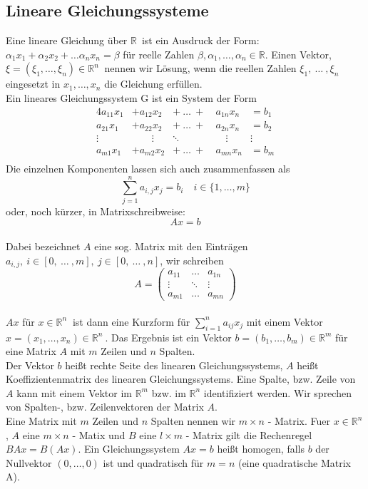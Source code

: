 \documentclass{article}
\newcommand{\R}{\mathbb{R}}
\newcommand{\mR}{$\mathbb{R}$\ }
\newcommand{\Rn}{\mathbb{R}^n\ }
\begin{document}
\subsection{Lineare Gleichungssysteme}
Eine lineare Gleichung über \mR ist ein Ausdruck der Form: $\alpha_1x_1 + \alpha_2 x_2 + \dots \alpha_n x_n = \beta$ für reelle Zahlen $\beta, \alpha_1, \dots, \alpha_n \in \R$. Einen Vektor, $\xi = \left(\xi_1, \dots, \xi_n\right) \in \Rn$ nennen wir Lösung, wenn die reellen Zahlen  $\xi_1, \ \dots\ , \xi_n$ eingesetzt in $x_1, \dots, x_n$ die Gleichung erfüllen.\\
Ein lineares Gleichungssystem G ist ein System der Form
\begin{alignat*}{4}
	a_{11} x_1 &+ a_{12}x_2 &+\ \dots\ +\ & a_{1n} x_n &= b_1\\
	a_{21} x_1 &+ a_{22}x_2 &+\ \dots\ +\ & a_{2n} x_n &= b_2\\
	\vdots\quad & \qquad\vdots&\ddots\quad \ \ &\quad\vdots & \vdots\  \\
	a_{m1} x_1 &+ a_{m2} x_2  &+\ \dots\ +\ & a_{mn} x_n &= b_m\\
\end{alignat*}
Die einzelnen Komponenten lassen sich auch zusammenfassen als $$\sum_{j=1}^n a_{i,j} x_j = b_i \quad i\in\{1,\dots,m\}$$
oder, noch kürzer, in Matrixschreibweise:
$$Ax=b$$\\
Dabei bezeichnet $A$ eine sog. Matrix mit den Einträgen $a_{i,j},\ i\in[0,\ \dots\ , m],\ j\in[0,\ \dots\ , n]$, wir schreiben\\
$$
A =
\begin{pmatrix}
a_{11} & \dots & a_{1n}\\
\vdots & \ddots& \vdots\\
a_{m1} & \dots & a_{mn}
\end{pmatrix}
$$\\
$Ax$ für $x \in \Rn$ ist dann eine Kurzform für $\sum_{i=1}^na_{ij}x_j$ mit einem Vektor $x = (x_1, \dots, x_n) \in \Rn$. Das Ergebnis ist ein Vektor $b = (b_1, \dots, b_m) \in \R^m$ für eine Matrix $A$ mit $m$ Zeilen und $n$ Spalten.\\
Der Vektor $b$ heißt rechte Seite des linearen Gleichungssystems, $A$ heißt Koeffizientenmatrix des linearen Gleichungssystems. Eine Spalte, bzw. Zeile von $A$ kann mit einem Vektor im $\R^m$ bzw. im $\R^n$ identifiziert werden. Wir sprechen von Spalten-, bzw. Zeilenvektoren der Matrix $A$.\\
Eine Matrix mit $m$ Zeilen und $n$ Spalten nennen wir $m\times n$ - Matrix. Fuer $x  \in \Rn $, $A$ eine $m\times n$ - Matix und $B$ eine $l\times m$ - Matrix gilt die Rechenregel $BAx = B(Ax)$. Ein Gleichungssystem $Ax=b$ heißt homogen, falls $b$ der Nullvektor $(0, \dots, 0)$ ist und quadratisch für  $m = n$ (eine quadratische Matrix A).\\
\end{document}
